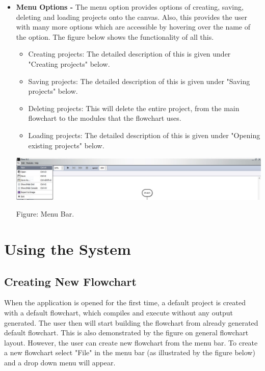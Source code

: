 \documentclass[11pt,a4paper,titlepage]{article}
\begin{document}
\begin{itemize}
						
			\item \textbf{Menu Options -} The menu option provides options of creating, saving, deleting and loading projects onto the canvas. Also, this provides the user with many more options which are accessible by hovering over the name of the option. The figure below shows the functionality of all this.\newline 
		
		\begin{itemize}
		\item Creating projects: The detailed description of this is given under "Creating projects"  below.
		\item Saving projects:  The detailed description of this is given under "Saving projects" below.
		\item Deleting projects: This will delete the entire project, from the main flowchart to the modules that the flowchart uses.
		\item Loading projects: The detailed description of this is given under "Opening existing projects" below.
\end{itemize}				
			
			\newpage
			\includegraphics[width=14cm]{images/Menu.jpg}
			\begin{center}
		Figure: Menu Bar. \newline \newline \newline
		\end{center}
			
			
		\end{itemize}

	
	
	
	
	
	
\section{Using the System}
	\subsection{Creating New Flowchart}
	
	When the application is opened for the first time, a default project is created with a default flowchart, which compiles and execute without any output generated. The user then will start building the flowchart from already generated default flowchart. This is also demonstrated by the figure on general flowchart layout. \newline\newline
However, the user can create new flowchart from the menu bar. To create a new flowchart select "File" in the menu bar (as illustrated by the figure below) and a drop down menu will appear.
\end{document}
